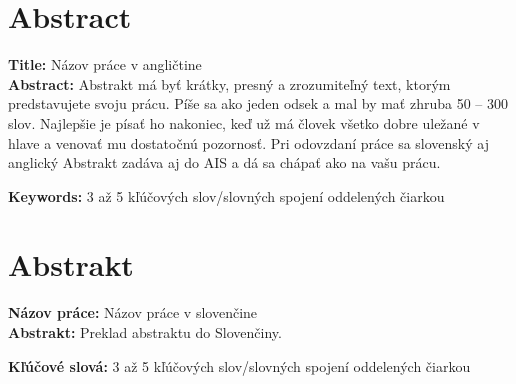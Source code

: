 \thispagestyle{empty}

\section*{Abstract}
\noindent \textbf{Title:} Názov práce v angličtine\\
\textbf{Abstract:} Abstrakt má byť krátky, presný a zrozumiteľný text, ktorým predstavujete svoju prácu. Píše sa ako jeden odsek a mal by mať zhruba 50 -- 300 slov. Najlepšie je písať ho nakoniec, keď už má človek všetko dobre uležané v hlave a venovať mu dostatočnú pozornosť. Pri odovzdaní práce sa slovenský aj anglický Abstrakt zadáva aj do AIS a dá sa chápať ako  na vašu prácu.

\vspace{10pt}

\noindent \textbf{Keywords:} 3 až 5 kľúčových slov/slovných spojení oddelených čiarkou

\vspace{+20pt}



\section*{Abstrakt}

\noindent \textbf{Názov práce:} Názov práce v slovenčine\\
\textbf{Abstrakt:} Preklad abstraktu do Slovenčiny.

\vspace{10pt}

\noindent \textbf{Kľúčové slová:} 3 až 5 kľúčových slov/slovných spojení oddelených čiarkou

\cleardoublepage

